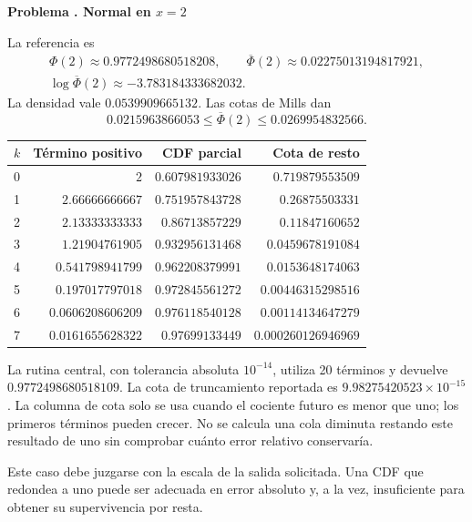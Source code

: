 \documentclass[11pt,a4paper]{article}
\theoremstyle{definition}
\newcommand{\Q}{\overline\Phi}
\newcounter{problema}
\newenvironment{resuelto}[1]{\refstepcounter{problema}\par\medskip\Needspace{6\baselineskip}\textbf{Problema \theproblema. #1}\par}{\par\medskip}
\begin{document}
\begin{resuelto}{Normal en $x=2$}
La referencia es
\[
\begin{gathered}
\Phi(2)\approx0.9772498680518208,\qquad \Q(2)\approx0.02275013194817921,\\
\log\Q(2)\approx-3.783184333682032.
\end{gathered}
\]
La densidad vale $0.0539909665132$. Las cotas de Mills dan
\[
0.0215963866053\le\Q(2)\le0.0269954832566.
\]

\begin{center}\small\begin{tabular}{lrrr}
\toprule
$k$ & Término positivo & CDF parcial & Cota de resto\\\midrule
0 & $2$ & $0.607981933026$ & $0.719879553509$\\
1 & $2.66666666667$ & $0.751957843728$ & $0.26875503331$\\
2 & $2.13333333333$ & $0.86713857229$ & $0.11847160652$\\
3 & $1.21904761905$ & $0.932956131468$ & $0.0459678191084$\\
4 & $0.541798941799$ & $0.962208379991$ & $0.0153648174063$\\
5 & $0.197017797018$ & $0.972845561272$ & $0.00446315298516$\\
6 & $0.0606208606209$ & $0.976118540128$ & $0.00114134647279$\\
7 & $0.0161655628322$ & $0.97699133449$ & $0.000260126946969$\\
\bottomrule\end{tabular}\end{center}

La rutina central, con tolerancia absoluta $10^{-14}$, utiliza 20 términos y devuelve $0.9772498680518109$. La cota de truncamiento reportada es $9.98275420523\times10^{-15}$. La columna de cota solo se usa cuando el cociente futuro es menor que uno; los primeros términos pueden crecer.
No se calcula una cola diminuta restando este resultado de uno sin comprobar cuánto error relativo conservaría.

Este caso debe juzgarse con la escala de la salida solicitada. Una CDF que redondea a uno puede ser adecuada en error absoluto y, a la vez, insuficiente para obtener su supervivencia por resta.
\end{resuelto}
\end{document}
